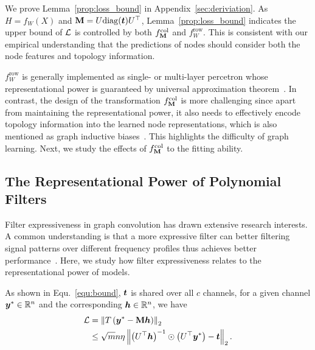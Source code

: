 \documentclass{article} %
\begin{document}
We prove Lemma~\ref{prop:loss_bound} in Appendix~\ref{sec:deriviation}.
As $H=f_W(X)$ and ${\mathbf{M}}=U\mathrm{diag}({\bm{t}})U^{\top}$, Lemma~\ref{prop:loss_bound} indicates the upper bound of ${\mathcal{L}}$ is controlled by both $f_{{\mathbf{M}}}^{\mathrm{col}}$ and $f_W^{\mathrm{row}}$.
This is consistent with our empirical understanding that the predictions of nodes should consider both the node features and topology information.

$f_W^{\mathrm{row}}$ is generally implemented as single- or multi-layer percetron whose representational power is guaranteed by universal approximation theorem~\citep{hornik1989multilayer,cybenko1989approximation}.
In contrast, the design of the transformation $f_{{\mathbf{M}}}^{\mathrm{col}}$ is more challenging since apart from maintaining the representational power, it also needs to effectively encode topology information into the learned node representations, which is also mentioned as graph inductive biases~\citep{ma2023graph}.
This highlights the difficulty of graph learning.
Next, we study the effects of $f_{{\mathbf{M}}}^{\mathrm{col}}$ to the fitting ability.

\subsection{The Representational Power of Polynomial Filters}
Filter expressiveness in graph convolution has drawn extensive research interests.
A common understanding is that a more expressive filter can better filtering signal patterns over different frequency profiles thus achieves better performance~\citep{chien2021adaptive,he2021bernnet,JacobiConv,yang2022spectrum,bo2022specformer}.
Here, we study how filter expressiveness relates to the representational power of models.

As shown in Equ.~\ref{equ:bound}, ${\bm{t}}$ is shared over all $c$ channels, for a given channel ${\bm{y}}^*\in{\mathbb{R}}^n$ and the corresponding ${\bm{h}}\in{\mathbb{R}}^n$, we have
\begin{equation}
	\label{equ:bound_s}
	\begin{aligned}
		{\mathcal{L}}&=\left\|T\left({\bm{y}}^*-{\mathbf{M}}{\bm{h}}\right)\right\|_2\\
		&\leq\sqrt{m}n\eta\left\|\left(U^{\top}{\bm{h}}\right)^{-1}\odot\left(U^{\top}{\bm{y}}^*\right)-{\bm{t}}\right\|_2.
	\end{aligned}
\end{equation}
\end{document}
